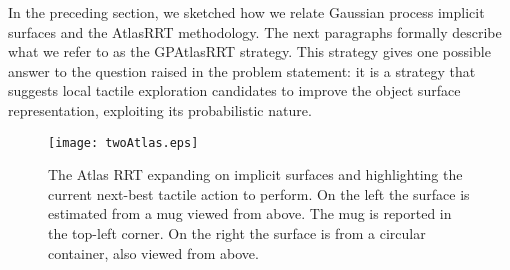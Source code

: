 In the preceding section, we sketched how we relate Gaussian process implicit surfaces and the AtlasRRT methodology. The next paragraphs formally describe what we refer to as the GPAtlasRRT strategy. This strategy gives one possible answer to the question raised in the problem statement: it is a strategy that suggests local tactile exploration candidates to improve the object surface representation, exploiting its probabilistic nature. 

\begin{figure*}[t]
    \centering
    \texttt{[image: twoAtlas.eps]}
    \caption{The Atlas RRT expanding on implicit surfaces and highlighting the current next-best tactile action to perform. On the left the surface is estimated from a mug viewed from above. The mug is reported in the top-left corner. On the right the surface is from a circular container, also viewed from above.}
    \label{fig:GPAtlasRRTtwo}
\end{figure*}

